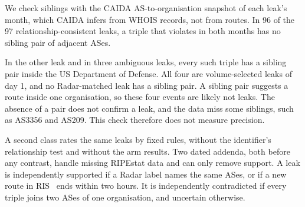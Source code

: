 We check siblings with the CAIDA AS-to-organisation snapshot of each leak's month, which CAIDA infers from WHOIS records, not from routes.
In 96 of the 97 relationship-consistent leaks, a triple that violates in both months has no sibling pair of adjacent ASes.

In the other leak and in three ambiguous leaks, every such triple has a sibling pair inside the US Department of Defense.
All four are volume-selected leaks of day 1, and no Radar-matched leak has a sibling pair.
A sibling pair suggests a route inside one organisation, so these four events are likely not leaks.
The absence of a pair does not confirm a leak, and the data miss some siblings, such as AS3356 and AS209.
This check therefore does not measure precision.

A second class rates the same leaks by fixed rules, without the identifier's relationship test and without the arm results.
Two dated addenda, both before any contrast, handle missing RIPEstat data and can only remove support.
A leak is independently supported if a Radar label names the same ASes, or if a new route in RIS~\cite{ripe_ris} ends within two hours.
It is independently contradicted if every triple joins two ASes of one organisation, and uncertain otherwise.

